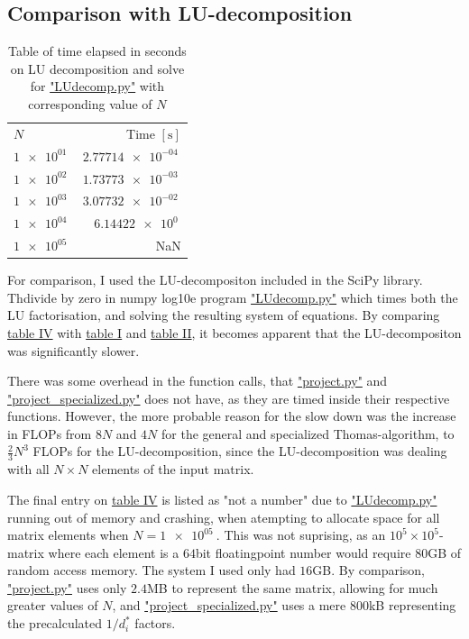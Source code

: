 \documentclass[english,notitlepage,reprint]{revtex4-1}  %
\begin{document}
\subsection{Comparison with LU-decomposition}\label{subsec:44}
\begin{table}[H]
	\centering
	\label{tab:441}
	\begin{tabular}{l|r}
	\(N\) & Time \([\si{\second}]\) \\
	\(\SI{1e+01}{}\) & \(\SI{2.77714e-04}{}\) \\
	\(\SI{1e+02}{}\) & \(\SI{1.73773e-03}{}\) \\
	\(\SI{1e+03}{}\) & \(\SI{3.07732e-02}{}\) \\
	\(\SI{1e+04}{}\) & \(\SI{6.14422e0}{}\) \\
	\(\SI{1e+05}{}\) & NaN \\
	\end{tabular}
	\caption{Table of time elapsed in seconds on LU decomposition and solve for
	\hyperref[A:2]{"LUdecomp.py"} with corresponding value of \(N\)}
\end{table}
For comparison, I used the LU-decompositon included in the SciPy library. Thdivide by zero in numpy log10e program \hyperref[A:5]{"LUdecomp.py"} which times both the LU factorisation, and solving the resulting system of equations. By comparing  \hyperref[tab:441]{table IV} with \hyperref[tab:421]{table I} and \hyperref[tab:422]{table II}, it becomes apparent that the LU-decompositon was significantly slower.

There was some overhead in the function calls, that \hyperref[A:1]{"project.py"} and \hyperref[A:2]{"project\_specialized.py"} does not have, as they are timed inside their respective functions. However, the more probable reason for the slow down was the increase in FLOPs from \(8N\) and \(4N\) for the general and specialized Thomas-algorithm, to
\(\frac{2}{3}N^{3}\) FLOPs for the LU-decomposition\citep{Hjorth-Jensen2018}, since the LU-decomposition was dealing with all \(N\times N\) elements of the input matrix.

The final entry on \hyperref[tab:441]{table IV} is listed as "not a number" due to \hyperref[A:5]{"LUdecomp.py"} running out of memory and crashing, when atempting to allocate space for all matrix elements when \(N = \SI{1e+05}{}\). This was not suprising, as an \(10^{5}\times 10^{5}\)-matrix where each element is a \(64\)bit floatingpoint number would require \(80\)GB of random access memory. The system I used only had \(16\)GB. By comparison, \hyperref[A:1]{"project.py"} uses only \(2.4\)MB to represent the same matrix, allowing for much greater values of \(N\), and \hyperref[A:2]{"project\_specialized.py"} uses a mere \(800\)kB representing the precalculated \(1/d_{i}^{*}\) factors.
\end{document}
